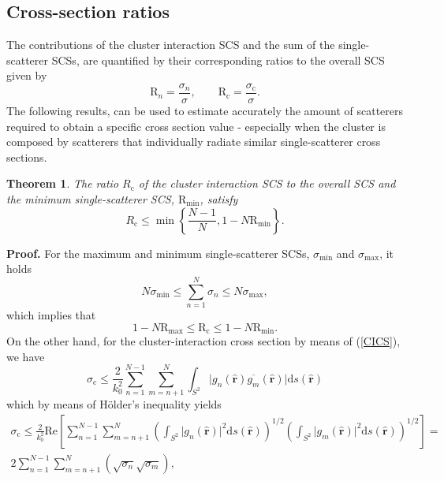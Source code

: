 \documentclass{article}
\newtheorem{theorem}{Theorem}
\begin{document}
\subsection{Cross-section ratios}
%
The contributions of the cluster interaction SCS and the sum of the single-scatterer SCSs, are quantified by their corresponding ratios to the overall SCS given by
%
\begin{equation}\label{ratios}
    \mathrm{R}_{n}=\frac{\sigma_n}{\sigma}, \qquad \mathrm{R}_{\mathrm{c}}=\frac{\sigma_\mathrm{c}}{\sigma}.
\end{equation}
%
The following results, can be used to estimate accurately the amount of scatterers required to obtain a specific cross section value - especially when the cluster is composed by scatterers that individually radiate similar single-scatterer cross sections. 
\begin{theorem}\label{Theorem3}
   The ratio $R_\mathrm{c}$ of the cluster interaction SCS to the overall SCS and the minimum single-scatterer SCS, $\mathrm{R}_{\mathrm{min}}$, satisfy
%
    \begin{equation}\label{Theorem3_01}
        R_\mathrm{c}\leq\min\left\{\frac{N-1}{N},1-N\mathrm{R}_{\mathrm{min}}\right\}.
    \end{equation}
%
\end{theorem}
%
\textbf{Proof.}
%
For the maximum and minimum single-scatterer SCSs, $\sigma_{\mathrm{min}}$ and $\sigma_{\mathrm{max}}$, it holds
%
    \begin{equation}
        \label{Theorem3_1}
        N\sigma_{\mathrm{min}}\leq \sum_{n=1}^{N}\sigma_n\leq N\sigma_{\mathrm{max}},
    \end{equation}
%
which implies that
%
\begin{equation}
    \label{Theorem3_2}
    1-N\mathrm{R}_{\mathrm{max}}\leq\mathrm{R}_\mathrm{c}\leq1-N\mathrm{R}_{\mathrm{min}}. 
\end{equation}
%
On the other hand, for the cluster-interaction cross section by means of (\ref{CICS}), we have
%
\begin{equation}
    \label{Theorem3_3}
    \sigma_\mathrm{c}\leq\frac{2}{k_0^2}\sum_{n=1}^{N-1}\sum_{m=n+1}^{N}\int_{S^2} \lvert g_n(\hat{\mathbf{r}})\overline{g_m}(\hat{\mathbf{r}})\rvert\mathrm{d}s(\hat{\mathbf{r}})
\end{equation}
%
which by means of H\"older's inequality yields
%
\begin{align}
\nonumber
    \sigma_\mathrm{c}\leq\frac{2}{k_0^2}\mathrm{Re}\left[\sum_{n=1}^{N-1}\sum_{m=n+1}^{N}\left(\int_{S^2}\lvert g_n(\hat{\mathbf{r}})\rvert^2\mathrm{d}s(\hat{\mathbf{r}})\right)^{1/2}\left(\int_{S^2}\lvert g_m(\hat{\mathbf{r}})\rvert^2\mathrm{d}s(\hat{\mathbf{r}})\right)^{1/2}\right]=\\2\sum_{n=1}^{N-1}\sum_{m=n+1}^{N}\left(\sqrt{\sigma_n}\sqrt{\sigma_m}\right),
    \label{Theorem3_4}
\end{align}
\end{document}
